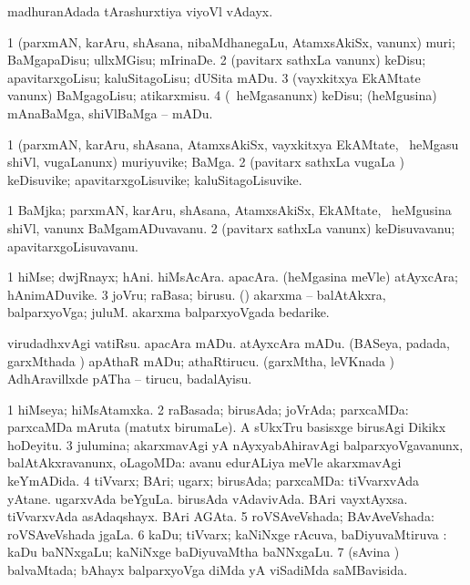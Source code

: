 {{{{{{{{\bentry
{} 
\gl{\nA}
\expl{}
\bmng
 madhuranAdada tArashurxtiya viyoVl vAdayx. 
\emng
\eentry

\bentry
{} 
\gl{\sakirx}
\expl{}
\bmng
\bnum
\num{1} (parxmAN, karAru, shAsana, nibaMdhanegaLu, AtamxsAkiSx, \mo vanunx) muri; BaMgapaDisu; ullxMGisu; mIrinaDe. 
\num{2} (pavitarx sathxLa \mo vanunx) keDisu; apavitarxgoLisu; kaluSitagoLisu; dUSita mADu. 
\num{3} (vayxkitxya EkAMtate \mo vanunx) BaMgagoLisu; atikarxmisu. 
\num{4} (\sA\ heMgasanunx) keDisu; (heMgusina) mAnaBaMga, shiVlBaMga -- mADu. 
\enum
\emng
\eentry

\bentry
{} 
\gl{\nA}
\expl{}
\bmng
\bnum
\num{1} (parxmAN, karAru, shAsana, AtamxsAkiSx, vayxkitxya EkAMtate, \sA\ heMgasu shiVl, \mo vugaLanunx) muriyuvike; BaMga. 
\num{2} (pavitarx sathxLa \mo vugaLa \vi) keDisuvike; apavitarxgoLisuvike; kaluSitagoLisuvike. 
\enum
\emng
\eentry

\bentry
{} 
\gl{\nA}
\expl{}
\bmng
\bnum
\num{1} BaMjka; parxmAN, karAru, shAsana, AtamxsAkiSx, EkAMtate, \sA\ heMgusina shiVl, \mo vanunx BaMgamADuvavanu. 
\num{2} (pavitarx sathxLa \mo vanunx) keDisuvavanu; apavitarxgoLisuvavanu. 
\enum
\emng
\eentry

\bentry
{} 
\gl{\nA}
\expl{}
\bmng
\bnum
\num{1} hiMse; dwjRnayx; hAni. 
\banum
{} hiMsAcAra. 
 apacAra. 
 (heMgasina meVle) atAyxcAra; hAnimADuvike. 
\eanum
\numie
\num{3} joVru; raBasa; birusu. 
 (\nAyxshA) 
\banum
{} akarxma -- balAtAkxra, balparxyoVga; juluM. 
 akarxma balparxyoVgada bedarike. 
\eanum
\numie
\enum
\emng

\noindent
\gl{\pagu}
\expl{}
\bmng
\banum
{} virudadhxvAgi vatiRsu. 
 apacAra mADu. 
 atAyxcAra mADu. 
 (BASeya, padada, garxMthada \vi) apAthaR mADu; athaRtirucu. 
 (garxMtha, leVKnada \vi) AdhAravillxde pATha -- tirucu, badalAyisu. 
\eanum
\emng
\eentry

\bentry
{} 
\gl{\gu}
\expl{}
\bmng
\bnum
\num{1} hiMseya; hiMsAtamxka. 
\num{2} raBasada; birusAda; joVrAda; parxcaMDa:  parxcaMDa mAruta (matutx birumaLe).  A sUkxTru basisxge birusAgi Dikikx hoDeyitu. 
\num{3} julumina; akarxmavAgi yA nAyxyabAhiravAgi balparxyoVgavanunx, balAtAkxravanunx, oLagoMDa:  avanu edurALiya meVle akarxmavAgi keYmADida. 
\num{4} tiVvarx; BAri; ugarx; birusAda; parxcaMDa:  tiVvarxvAda yAtane.  ugarxvAda beYguLa.  birusAda vAdavivAda.  BAri vayxtAyxsa.  tiVvarxvAda asAdaqshayx.  BAri AGAta. 
\num{5} roVSAveVshada; BAvAveVshada:  roVSAveVshada jgaLa. 
\num{6} kaDu; tiVvarx; kaNiNxge rAcuva, baDiyuvaMtiruva :  kaDu baNNxgaLu; kaNiNxge baDiyuvaMtha baNNxgaLu. 
\num{7} (sAvina \vi) balvaMtada; bAhayx balparxyoVga diMda yA viSadiMda saMBavisida. 
\enum
\emng
\eentry

}}}}}}}}
